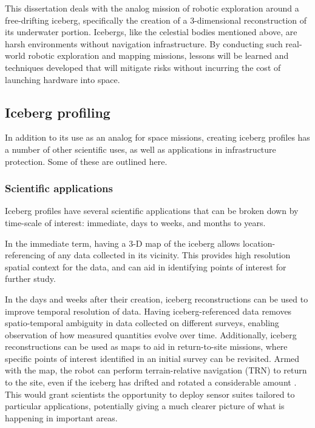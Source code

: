 This dissertation deals with the analog mission of robotic exploration around a free-drifting iceberg, specifically the creation of a 3-dimensional reconstruction of its underwater portion. Icebergs, like the celestial bodies mentioned above, are harsh environments without navigation infrastructure. By conducting such real-world robotic exploration and mapping missions, lessons will be learned and techniques developed that will mitigate risks without incurring the cost of launching hardware into space. 

\subsection{Iceberg profiling}

In addition to its use as an analog for space missions, creating iceberg profiles has a number of other scientific uses, as well as applications in infrastructure protection. Some of these are outlined here.

\subsubsection{Scientific applications}

Iceberg profiles have several scientific applications that can be broken down by time-scale of interest: immediate, days to weeks, and months to years. 

In the immediate term, having a 3-D map of the iceberg allows location-referencing of any data collected in its vicinity. This provides high resolution spatial context for the data, and can aid in identifying points of interest for further study. 

In the days and weeks after their creation, iceberg reconstructions can be used to improve temporal resolution of data. Having iceberg-referenced data removes spatio-temporal ambiguity in data collected on different surveys, enabling observation of how measured quantities evolve over time. Additionally, iceberg reconstructions can be used as maps to aid in return-to-site missions, where specific points of interest identified in an initial survey can be revisited. Armed with the map, the robot can perform terrain-relative navigation (TRN) to return to the site, even if the iceberg has drifted and rotated a considerable amount \cite{Kimball2011b}. This would grant scientists the opportunity to deploy sensor suites tailored to particular applications, potentially giving a much clearer picture of what is happening in important areas.

